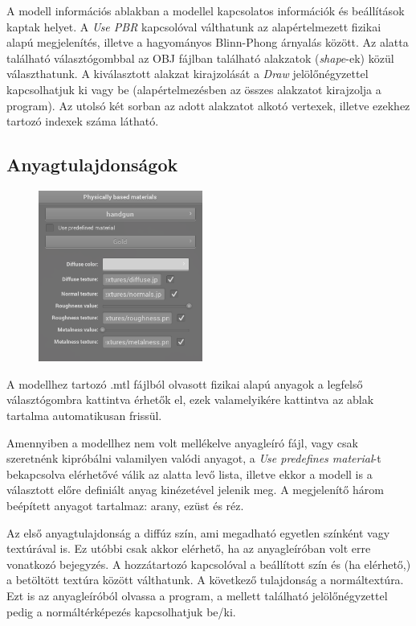 A modell információs ablakban a modellel kapcsolatos információk és beállítások kaptak helyet. A \textit{Use PBR} kapcsolóval válthatunk az alapértelmezett fizikai alapú megjelenítés, illetve a hagyományos Blinn-Phong árnyalás között. Az alatta található választógombbal az OBJ fájlban található alakzatok (\textit{shape}-ek) közül választhatunk. A kiválasztott alakzat kirajzolását a \textit{Draw} jelölőnégyzettel kapcsolhatjuk ki vagy be (alapértelmezésben az összes alakzatot kirajzolja a program). Az utolsó két sorban az adott alakzatot alkotó vertexek, illetve ezekhez tartozó indexek száma látható.

\subsection{Anyagtulajdonságok}

\begin{figure}
    \vspace{-23pt}
    \includegraphics[width=0.48\textwidth]{images/pbr_materials.png}
    \vspace{-20pt}
\end{figure}

A modellhez tartozó .mtl fájlból olvasott fizikai alapú anyagok a legfelső választógombra kattintva érhetők el, ezek valamelyikére kattintva az ablak tartalma automatikusan frissül.

Amennyiben a modellhez nem volt mellékelve anyagleíró fájl, vagy csak szeretnénk kipróbálni valamilyen valódi anyagot, a \textit{Use predefines material}-t bekapcsolva elérhetővé válik az alatta levő lista, illetve ekkor a modell is a választott előre definiált anyag kinézetével jelenik meg. A megjelenítő három beépített anyagot tartalmaz: arany, ezüst és réz.

Az első anyagtulajdonság a diffúz szín, ami megadható egyetlen színként vagy textúrával is. Ez utóbbi csak akkor elérhető, ha az anyagleíróban volt erre vonatkozó bejegyzés. A hozzátartozó kapcsolóval a beállított szín és (ha elérhető,) a betöltött textúra között válthatunk. A következő tulajdonság a normáltextúra. Ezt is az anyagleíróból olvassa a program, a mellett található jelölőnégyzettel pedig a normáltérképezés kapcsolhatjuk be/ki.

